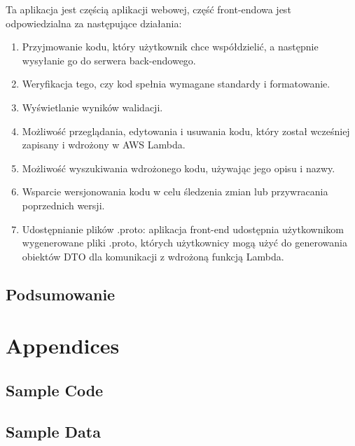 \documentclass[runningheads,12pt]{llncs}
\begin{document}
Ta aplikacja jest częścią aplikacji webowej, część front-endowa jest odpowiedzialna za następujące działania:
\begin{enumerate}
    \item Przyjmowanie kodu, który użytkownik chce współdzielić, a następnie wysyłanie go do serwera back-endowego.
    \item Weryfikacja tego, czy kod spełnia wymagane standardy i formatowanie.
    \item Wyświetlanie wyników walidacji.
    \item Możliwość przeglądania, edytowania i usuwania kodu, który został wcześniej zapisany i wdrożony w AWS Lambda.
    \item Możliwość wyszukiwania wdrożonego kodu, używając jego opisu i nazwy.
    \item Wsparcie wersjonowania kodu w celu śledzenia zmian lub przywracania poprzednich wersji.
    \item Udostępnianie plików .proto: aplikacja front-end udostępnia użytkownikom wygenerowane pliki .proto, których użytkownicy mogą użyć do generowania obiektów DTO dla komunikacji z wdrożoną funkcją Lambda.
\end{enumerate}

\subsection{Podsumowanie}

\nocite{*}

\listoftables

\listoffigures




\section{Appendices}

\subsection{Sample Code}
\subsection{Sample Data}
\end{document}
